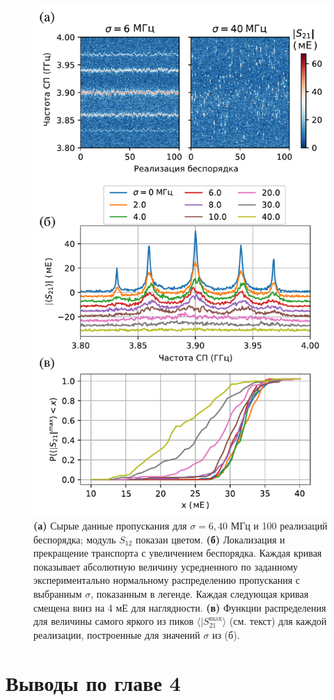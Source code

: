 \documentclass[14pt, a4paper]{extreport}
\numberwithin{equation}{section}
\begin{document}
	
\begin{figure}
	\centering
	\includegraphics[width=0.6\linewidth]{Pictures/mbl}
	\caption{\textbf{(а)} Сырые данные пропускания для $\sigma = 6, 40$ МГц и 100 реализаций беспорядка; модуль $S_{12}$ показан цветом. \textbf{(б)} Локализация и прекращение транспорта с увеличением беспорядка. Каждая кривая показывает абсолютную величину усредненного по заданному экспериментально нормальному распределению пропускания с выбранным $\sigma$, показанным в легенде. Каждая следующая кривая смещена вниз на 4 мЕ для наглядности. \textbf{(в)} Функции распределения для величины самого яркого из пиков $\langle |S_{21}^{\text{max}}\rangle$ (см. текст) для каждой реализации, построенные для значений $\sigma$ из (б).}
	\label{fig:mbl}
\end{figure}

\section{Выводы по главе 4}
\end{document}
